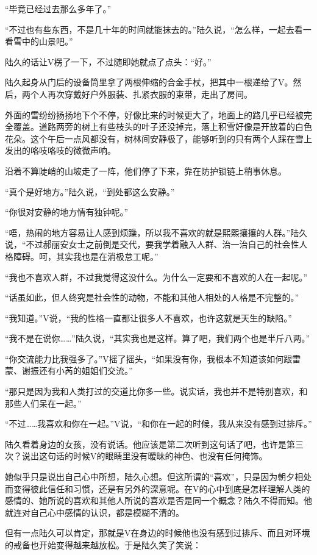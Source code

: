 “毕竟已经过去那么多年了。”

“不过也有些东西，不是几十年的时间就能抹去的。”陆久说，“怎么样，一起去看一看雪中的山景吧。”

陆久的话让V楞了一下，不过随即她就点了点头：“好。”

陆久起身从门后的设备筒里拿了两根伸缩的合金手杖，把其中一根递给了V。然后，两个人再次穿戴好户外服装、扎紧衣服的束带，走出了房间。

外面的雪纷纷扬扬地下个不停，好像比来的时候更大了，地面上的路几乎已经被完全覆盖。道路两旁的树上有些枝头的叶子还没掉完，落上积雪好像是开放着的白色花朵。这个午后一点风都没有，树林间安静极了，能够听到的只有两个人踩在雪上发出的咯吱咯吱的微微声响。

沿着不算陡峭的山坡走了一阵，他们停了下来，靠在防护锁链上稍事休息。

“真个是好地方。”陆久说，“到处都这么安静。”

“你很对安静的地方情有独钟呢。”

“唔，热闹的地方容易让人感到烦躁，所以我不喜欢的就是熙熙攘攘的人群。”陆久说，“不过郝丽安女士之前倒是交代，要我学着融入人群、治一治自己的社会性人格障碍。呵，其实我也是在消极怠工呢。”

“我也不喜欢人群，不过我觉得这没什么。为什么一定要和不喜欢的人在一起呢。”

“话虽如此，但人终究是社会性的动物，不能和其他人相处的人格是不完整的。”

“我知道。”V说，“我的性格一直都让很多人不喜欢，也许这就是天生的缺陷。”

“我不是在说你……”陆久说，“其实我也是这样。算了吧，我们两个也是半斤八两。”

“你交流能力比我强多了。”V摇了摇头，“如果没有你，我根本不知道该如何跟雷蒙、谢振还有小芮的姐姐们交流。”

“那只是因为我和人类打过的交道比你多一些。说实话，我也并不是特别喜欢，和那些人们呆在一起。”

“不过……我喜欢和你在一起。”V说，“和你在一起的时候，我从来没有感到过排斥。”

陆久看着身边的女孩，没有说话。他应该是第二次听到这句话了吧，也许是第三次？说出这句话的时候V的眼睛里没有暧昧的神色、也没有任何掩饰。

她似乎只是说出自己心中所想，陆久心想。但这所谓的“喜欢”，只是因为朝夕相处而变得彼此信任和习惯，还是有另外的深意呢。在V的心中到底是怎样理解人类的感情的、她所说的喜欢和其他人所说的喜欢是否是同一个概念？陆久不得而知。他就连对自己心中感情的认识，都是模糊不清的。

但有一点陆久可以肯定，那就是V在身边的时候他也没有感到过排斥、而且对环境的戒备也开始变得越来越放松。于是陆久笑了笑说：

